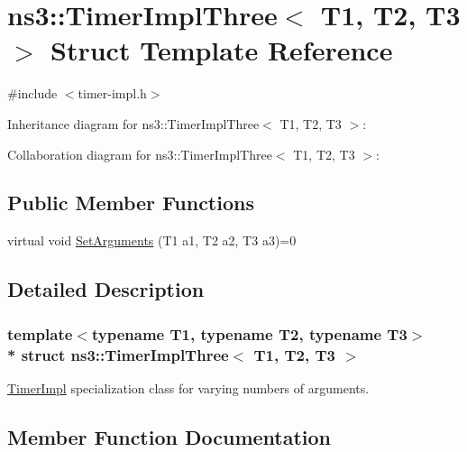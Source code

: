 \hypertarget{structns3_1_1TimerImplThree}{}\section{ns3\+:\+:Timer\+Impl\+Three$<$ T1, T2, T3 $>$ Struct Template Reference}
\label{structns3_1_1TimerImplThree}


{\ttfamily \#include $<$timer-\/impl.\+h$>$}



Inheritance diagram for ns3\+:\+:Timer\+Impl\+Three$<$ T1, T2, T3 $>$\+:


Collaboration diagram for ns3\+:\+:Timer\+Impl\+Three$<$ T1, T2, T3 $>$\+:
\subsection*{Public Member Functions}
\begin{DoxyCompactItemize}
\item 
virtual void \hyperlink{structns3_1_1TimerImplThree_a679c0b26f7332a710d50ceaa4767281c}{Set\+Arguments} (T1 a1, T2 a2, T3 a3)=0
\end{DoxyCompactItemize}


\subsection{Detailed Description}
\subsubsection*{template$<$typename T1, typename T2, typename T3$>$\\*
struct ns3\+::\+Timer\+Impl\+Three$<$ T1, T2, T3 $>$}

\hyperlink{classns3_1_1TimerImpl}{Timer\+Impl} specialization class for varying numbers of arguments. 

\subsection{Member Function Documentation}

